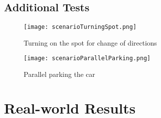 \subsection{Additional Tests}

\begin{figure}[h]
    \texttt{[image: scenarioTurningSpot.png]}
    \caption{Turning on the spot for change of directions}
    \label{fig:scenarioTurningSpot}
\end{figure}

\begin{figure}[h]
    \texttt{[image: scenarioParallelParking.png]}
    \caption{Parallel parking the car}
    \label{fig:scenarioParallelParking}
\end{figure}

%

\section{Real-world Results}